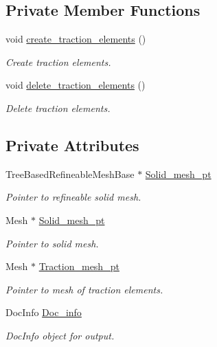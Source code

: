 \subsection*{Private Member Functions}
\begin{DoxyCompactItemize}
\item 
void \hyperlink{classAnnularDiskProblem_aeab547741d3b500af5f465e52e1ba57c}{create\+\_\+traction\+\_\+elements} ()
\begin{DoxyCompactList}\small\item\em Create traction elements. \end{DoxyCompactList}\item 
void \hyperlink{classAnnularDiskProblem_ae665013c94a3277cd1bf124158a4e8f2}{delete\+\_\+traction\+\_\+elements} ()
\begin{DoxyCompactList}\small\item\em Delete traction elements. \end{DoxyCompactList}\end{DoxyCompactItemize}
\subsection*{Private Attributes}
\begin{DoxyCompactItemize}
\item 
Tree\+Based\+Refineable\+Mesh\+Base $\ast$ \hyperlink{classAnnularDiskProblem_a7ef68977578d396e673a57bdf35f931c}{Solid\+\_\+mesh\+\_\+pt}
\begin{DoxyCompactList}\small\item\em Pointer to refineable solid mesh. \end{DoxyCompactList}\item 
Mesh $\ast$ \hyperlink{classAnnularDiskProblem_a2cc0ee9d7a87cdd2857b1c34e9d14c00}{Solid\+\_\+mesh\+\_\+pt}
\begin{DoxyCompactList}\small\item\em Pointer to solid mesh. \end{DoxyCompactList}\item 
Mesh $\ast$ \hyperlink{classAnnularDiskProblem_ac35f917b7678de36c2942530fc9ba4d6}{Traction\+\_\+mesh\+\_\+pt}
\begin{DoxyCompactList}\small\item\em Pointer to mesh of traction elements. \end{DoxyCompactList}\item 
Doc\+Info \hyperlink{classAnnularDiskProblem_aabdb5b1d506e3f758629c87395d0747d}{Doc\+\_\+info}
\begin{DoxyCompactList}\small\item\em Doc\+Info object for output. \end{DoxyCompactList}\end{DoxyCompactItemize}


